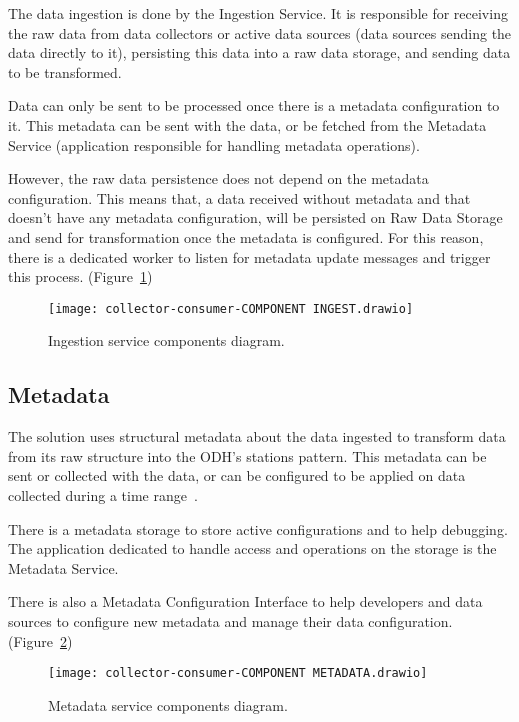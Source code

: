 The data ingestion is done by the Ingestion Service. It is responsible for receiving the raw data from data collectors or active data sources (data sources sending the data directly to it), persisting this data into a raw data storage, and sending data to be transformed.

Data can only be sent to be processed once there is a metadata configuration to it. This metadata can be sent with the data, or be fetched from the Metadata Service (application responsible for handling metadata operations).

However, the raw data persistence does not depend on the metadata configuration. This means that, a data received without metadata and that doesn't have any metadata configuration, will be persisted on Raw Data Storage and send for transformation once the metadata is configured. For this reason, there is a dedicated worker to listen for metadata update messages and trigger this process. (Figure~\ref{fig:ingest})

\begin{figure}
    \centering
    \texttt{[image: collector-consumer-COMPONENT INGEST.drawio]}
    \caption{Ingestion service components diagram.\label{fig:ingest}}
\end{figure}

\subsection{Metadata}
\label{sec:metadata}

The solution uses structural metadata about the data ingested to transform data from its raw structure into the ODH's stations pattern. This metadata can be sent or collected with the data, or can be configured to be applied on data collected during a time range~\cite{Metadata}.

There is a metadata storage to store active configurations and to help debugging. The application dedicated to handle access and operations on the storage is the Metadata Service.

There is also a Metadata Configuration Interface to help developers and data sources to configure new metadata and manage their data configuration. (Figure~\ref{fig:metadata})

\begin{figure}
    \centering
    \texttt{[image: collector-consumer-COMPONENT METADATA.drawio]}
    \caption{Metadata service components diagram.\label{fig:metadata}}
\end{figure}


